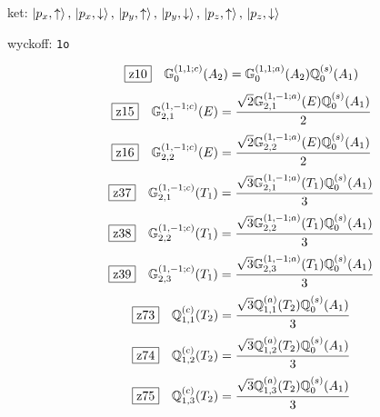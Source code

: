 \documentclass[fleqn,10pt,landscape]{jsarticle}
\begin{document}
\noindent\quad * ket: $\ket{p_{x},\uparrow},\, \ket{p_{x},\downarrow},\, \ket{p_{y},\uparrow},\, \ket{p_{y},\downarrow},\, \ket{p_{z},\uparrow},\, \ket{p_{z},\downarrow}$

\noindent\quad * wyckoff: \texttt{1o}

\begin{dmath*}
\hspace*{3mm}\fbox{z10}\quad \mathbb{G}_{0}^{(1,1;c)}(A_{2})=\mathbb{G}_{0}^{(1,1;a)}(A_{2}) \mathbb{Q}_{0}^{(s)}(A_{1})
\end{dmath*}
\begin{dmath*}
\hspace*{3mm}\fbox{z15}\quad \mathbb{G}_{2,1}^{(1,-1;c)}(E)=\frac{\sqrt{2} \mathbb{G}_{2,1}^{(1,-1;a)}(E) \mathbb{Q}_{0}^{(s)}(A_{1})}{2}
\end{dmath*}
\begin{dmath*}
\hspace*{3mm}\fbox{z16}\quad \mathbb{G}_{2,2}^{(1,-1;c)}(E)=\frac{\sqrt{2} \mathbb{G}_{2,2}^{(1,-1;a)}(E) \mathbb{Q}_{0}^{(s)}(A_{1})}{2}
\end{dmath*}
\begin{dmath*}
\hspace*{3mm}\fbox{z37}\quad \mathbb{G}_{2,1}^{(1,-1;c)}(T_{1})=\frac{\sqrt{3} \mathbb{G}_{2,1}^{(1,-1;a)}(T_{1}) \mathbb{Q}_{0}^{(s)}(A_{1})}{3}
\end{dmath*}
\begin{dmath*}
\hspace*{3mm}\fbox{z38}\quad \mathbb{G}_{2,2}^{(1,-1;c)}(T_{1})=\frac{\sqrt{3} \mathbb{G}_{2,2}^{(1,-1;a)}(T_{1}) \mathbb{Q}_{0}^{(s)}(A_{1})}{3}
\end{dmath*}
\begin{dmath*}
\hspace*{3mm}\fbox{z39}\quad \mathbb{G}_{2,3}^{(1,-1;c)}(T_{1})=\frac{\sqrt{3} \mathbb{G}_{2,3}^{(1,-1;a)}(T_{1}) \mathbb{Q}_{0}^{(s)}(A_{1})}{3}
\end{dmath*}
\begin{dmath*}
\hspace*{3mm}\fbox{z73}\quad \mathbb{Q}_{1,1}^{(c)}(T_{2})=\frac{\sqrt{3} \mathbb{Q}_{1,1}^{(a)}(T_{2}) \mathbb{Q}_{0}^{(s)}(A_{1})}{3}
\end{dmath*}
\begin{dmath*}
\hspace*{3mm}\fbox{z74}\quad \mathbb{Q}_{1,2}^{(c)}(T_{2})=\frac{\sqrt{3} \mathbb{Q}_{1,2}^{(a)}(T_{2}) \mathbb{Q}_{0}^{(s)}(A_{1})}{3}
\end{dmath*}
\begin{dmath*}
\hspace*{3mm}\fbox{z75}\quad \mathbb{Q}_{1,3}^{(c)}(T_{2})=\frac{\sqrt{3} \mathbb{Q}_{1,3}^{(a)}(T_{2}) \mathbb{Q}_{0}^{(s)}(A_{1})}{3}
\end{dmath*}
\end{document}
